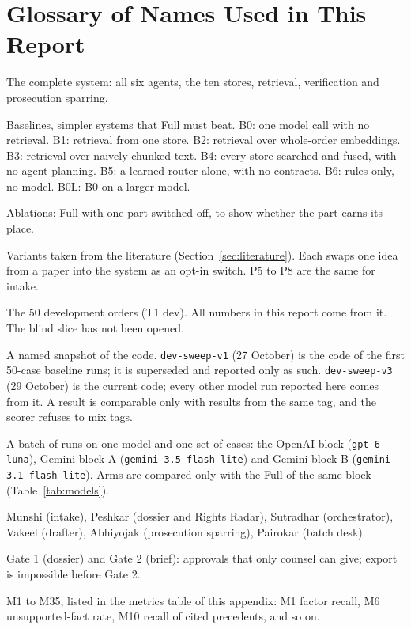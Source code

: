 \section{Glossary of Names Used in This Report}
\label{sec:glossary}

\begin{description}\itemsep0pt
\item[Full] The complete system: all six agents, the ten stores, retrieval, verification and prosecution sparring.
\item[B0 to B6] Baselines, simpler systems that Full must beat. B0: one model call with no retrieval. B1: retrieval from one store. B2: retrieval over whole-order embeddings. B3: retrieval over naively chunked text. B4: every store searched and fused, with no agent planning. B5: a learned router alone, with no contracts. B6: rules only, no model. B0L: B0 on a larger model.
\item[A1 to A10] Ablations: Full with one part switched off, to show whether the part earns its place.
\item[S1 to S18] Variants taken from the literature (Section~\ref{sec:literature}). Each swaps one idea from a paper into the system as an opt-in switch. P5 to P8 are the same for intake.
\item[Dev set] The 50 development orders (T1 dev). All numbers in this report come from it. The blind slice has not been opened.
\item[Code tag] A named snapshot of the code. \texttt{dev-sweep-v1} (27 October) is the code of the first 50-case baseline runs; it is superseded and reported only as such. \texttt{dev-sweep-v3} (29 October) is the current code; every other model run reported here comes from it. A result is comparable only with results from the same tag, and the scorer refuses to mix tags.
\item[Block] A batch of runs on one model and one set of cases: the OpenAI block (\texttt{gpt-6-luna}), Gemini block A (\texttt{gemini-3.5-flash-lite}) and Gemini block B (\texttt{gemini-3.1-flash-lite}). Arms are compared only with the Full of the same block (Table~\ref{tab:models}).
\item[Agents] Munshi (intake), Peshkar (dossier and Rights Radar), Sutradhar (orchestrator), Vakeel (drafter), Abhiyojak (prosecution sparring), Pairokar (batch desk).
\item[Gates] Gate 1 (dossier) and Gate 2 (brief): approvals that only counsel can give; export is impossible before Gate 2.
\item[Metrics] M1 to M35, listed in the metrics table of this appendix: M1 factor recall, M6 unsupported-fact rate, M10 recall of cited precedents, and so on.
\end{description}

